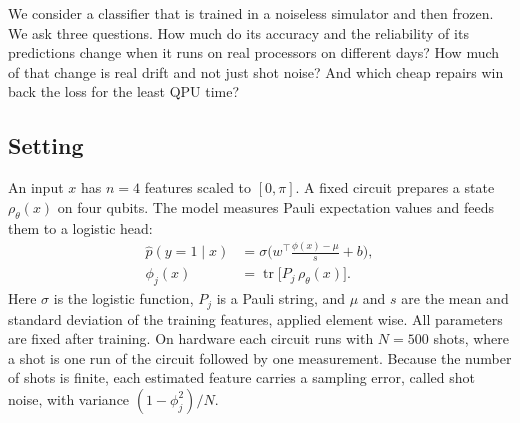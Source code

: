 \documentclass[10pt,conference]{IEEEtran}
\begin{document}
We consider a classifier that is trained in a noiseless simulator and then frozen. We ask three
questions. How much do its accuracy and the reliability of its predictions
change when it runs on real processors on different days? How much of that change is real drift
and not just shot noise? And which cheap repairs win back the loss for the least QPU time?

\subsection{Setting}
An input $x$ has $n=4$ features scaled to $[0,\pi]$. A fixed circuit prepares a state
$\rho_\theta(x)$ on four qubits. The model measures Pauli expectation values and feeds them to a
logistic head:
\begin{align}
\hat p(y=1\mid x)&=\sigma\!\Big(w^\top\frac{\phi(x)-\mu}{s}+b\Big), \label{eq:model}\\
\phi_j(x)&=\operatorname{tr}\!\big[P_j\,\rho_\theta(x)\big]. \nonumber
\end{align}
Here $\sigma$ is the logistic function, $P_j$ is a Pauli string, and $\mu$ and $s$ are the mean and standard deviation of the training features, applied element wise. All parameters are fixed after training. On hardware each circuit runs
with $N=500$ shots, where a shot is one run of the circuit followed by one measurement. Because the number of shots is finite, each estimated feature carries a sampling error, called
shot noise, with variance $(1-\phi_j^2)/N$.
\end{document}
